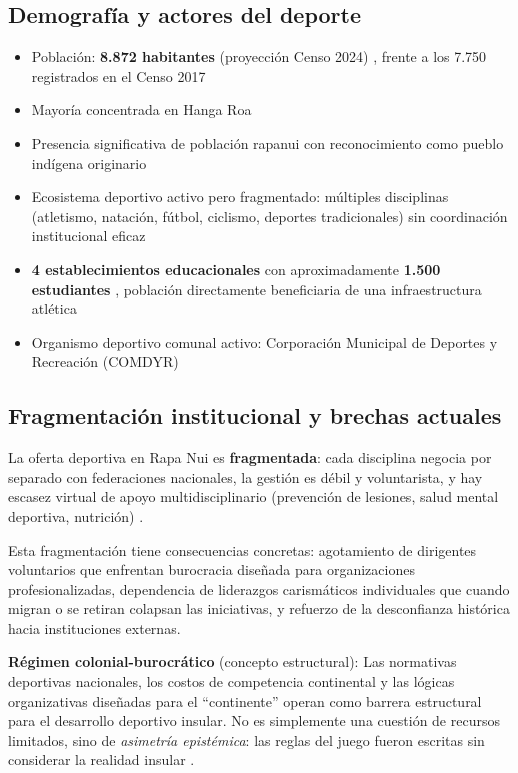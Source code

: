 \documentclass[12pt, a4paper]{article}
\begin{document}
\subsection{Demografía y actores del deporte}

\begin{itemize}[leftmargin=*, itemsep=3pt]
  \item Población: \textbf{8.872 habitantes} (proyección Censo 2024) \citep{INE2024, BCN2025}, frente a los 7.750 registrados en el Censo 2017
  \item Mayoría concentrada en Hanga Roa
  \item Presencia significativa de población rapanui con reconocimiento como
        pueblo indígena originario
  \item Ecosistema deportivo activo pero fragmentado: múltiples disciplinas
        (atletismo, natación, fútbol, ciclismo, deportes tradicionales) sin
        coordinación institucional eficaz
  \item \textbf{4 establecimientos educacionales} con aproximadamente \textbf{1.500 estudiantes} \citep{BCN2025}, población directamente beneficiaria de una infraestructura atlética
  \item Organismo deportivo comunal activo: Corporación Municipal de Deportes y Recreación (COMDYR)
\end{itemize}

\subsection{Fragmentación institucional y brechas actuales}

La oferta deportiva en Rapa Nui es \textbf{fragmentada}: cada disciplina negocia
por separado con federaciones nacionales, la gestión es débil y voluntarista, y hay
escasez virtual de apoyo multidisciplinario (prevención de lesiones, salud mental
deportiva, nutrición) \citep{ortega2026}.

Esta fragmentación tiene consecuencias concretas: agotamiento de dirigentes
voluntarios que enfrentan burocracia diseñada para organizaciones profesionalizadas,
dependencia de liderazgos carismáticos individuales que cuando migran o se retiran
colapsan las iniciativas, y refuerzo de la desconfianza histórica hacia instituciones
externas.

\begin{conceptoclave}
  \textbf{Régimen colonial-burocrático} (concepto estructural):
  Las normativas deportivas nacionales, los costos de competencia continental y las
  lógicas organizativas diseñadas para el ``continente'' operan como barrera
  estructural para el desarrollo deportivo insular. No es simplemente una cuestión
  de recursos limitados, sino de \textit{asimetría epistémica}: las reglas del juego
  fueron escritas sin considerar la realidad insular \citep{escobar2007}.
\end{conceptoclave}
\end{document}

